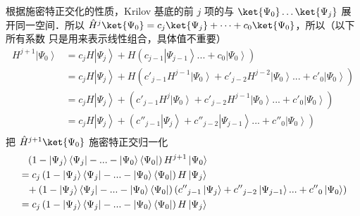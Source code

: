 根据施密特正交化的性质，Krilov 基底的前 $j$ 项的与 $\ket{\Psi_0}\dots\ket{\Psi_j}$ 展开同一空间．所以 $\hat H^j\ket{\Psi_0} = c_j\ket{\Psi_j} +\dots + c_0 \ket{\Psi_0}$，所以（以下所有系数 只是用来表示线性组合，具体值不重要）
\begin{equation}\begin{aligned}
  {H^{j + 1}}\left| {\Psi_0} \right\rangle  &= {c_j}H\left| {\Psi_j} \right\rangle  + H\left( {{c_{j - 1}}\left| {\Psi_{j - 1}} \right\rangle ... + {c_0}\left| {\Psi_0} \right\rangle } \right)  \\
   &= {c_j}H\left| {\Psi_j} \right\rangle  + H\left( {{{c'}_{j - 1}}{H^{j - 1}}\left| {\Psi_0} \right\rangle  + {{c'}_{j - 2}}{H^{j - 2}}\left| {\Psi_0} \right\rangle ... + {{c'}_0}\left| {\Psi_0} \right\rangle } \right)  \\
   &= {c_j}H\left| {\Psi_j} \right\rangle  + \left( {{{c'}_{j - 1}}{H^j}\left| {\Psi_0} \right\rangle  + {{c'}_{j - 2}}{H^{j - 1}}\left| {\Psi_0} \right\rangle ... + {{c'}_0}\left| {\Psi_0} \right\rangle } \right)  \\
   &= {c_j}H\left| {\Psi_j} \right\rangle  + \left( {{{c''}_{j - 1}}\left| {\Psi_j} \right\rangle  + {{c''}_{j - 2}}\left| {\Psi_{j - 1}} \right\rangle ... + {{c''}_0}\left| {\Psi_0} \right\rangle } \right)  \\ 
\end{aligned}\end{equation}
把 $\hat H^{j+1}\ket{\Psi_0}$ 施密特正交归一化
\begin{equation}
\begin{aligned}
&{\phantom{=}}\left( {1 - \left| {\Psi_j} \right\rangle \left\langle {\Psi_j} \right| - ... - \left| {\Psi_0} \right\rangle \left\langle {\Psi_0} \right|} \right){H^{j + 1}}\left| {\Psi_0} \right\rangle  \hfill \\
&= {c_j}\left( {1 - \left| {\Psi_j} \right\rangle \left\langle {\Psi_j} \right| - ... - \left| {\Psi_0} \right\rangle \left\langle {\Psi_0} \right|} \right)H\left| {\Psi_j} \right\rangle  \hfill \\
&{\phantom{=}}+ \left( {1 - \left| {\Psi_j} \right\rangle \left\langle {\Psi_j} \right| - ... - \left| {\Psi_0} \right\rangle \left\langle {\Psi_0} \right|} \right)\left( {{{c''}_{j - 1}}\left| {\Psi_j} \right\rangle  + {{c''}_{j - 2}}\left| {\Psi_{j - 1}} \right\rangle ... + {{c''}_0}\left| {\Psi_0} \right\rangle } \right) \hfill \\
&= {c_j}\left( {1 - \left| {\Psi_j} \right\rangle \left\langle {\Psi_j} \right| - ... - \left| {\Psi_0} \right\rangle \left\langle {\Psi_0} \right|} \right)H\left| {\Psi_j} \right\rangle  \hfill \\ 
\end{aligned}
\end{equation}

